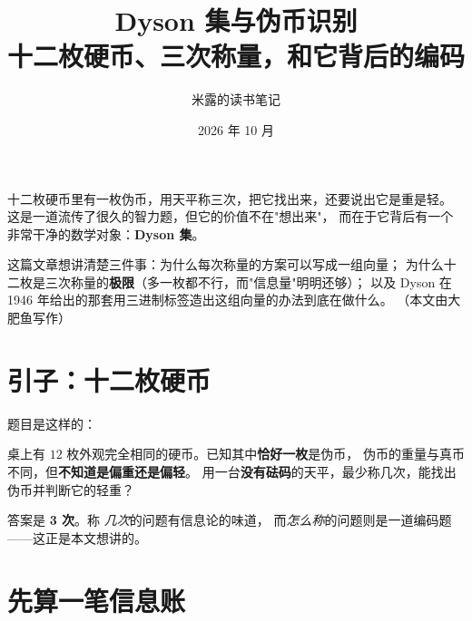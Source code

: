 \documentclass[UTF8,11pt,fontset=macnew]{ctexart}
\title{\bfseries Dyson 集与伪币识别\\[0.35em]
  \large 十二枚硬币、三次称量，和它背后的编码}
\author{米露的读书笔记}
\date{2026 年 10 月}
\begin{document}
\maketitle
\pagestyle{plain}
\thispagestyle{empty}

\begin{keybox}[这篇文章想做的事]
十二枚硬币里有一枚伪币，用天平称三次，把它找出来，还要说出它是重是轻。
这是一道流传了很久的智力题，但它的价值不在"想出来"，
而在于它背后有一个非常干净的数学对象：\textbf{Dyson 集}。

这篇文章想讲清楚三件事：为什么每次称量的方案可以写成一组向量；
为什么十二枚是三次称量的\textbf{极限}（多一枚都不行，而"信息量"明明还够）；
以及 Dyson 在 1946 年给出的那套用三进制标签造出这组向量的办法到底在做什么。
（本文由大肥鱼写作）
\end{keybox}

\section{引子：十二枚硬币}

\begin{center}
\end{center}

题目是这样的：

\begin{keybox}[十二枚硬币问题]
桌上有 $12$ 枚外观完全相同的硬币。已知其中\textbf{恰好一枚}是伪币，
伪币的重量与真币不同，但\textbf{不知道是偏重还是偏轻}。
用一台\textbf{没有砝码}的天平，最少称几次，能找出伪币并判断它的轻重？
\end{keybox}

答案是 \textbf{3 次}。称 \emph{几次}的问题有信息论的味道，
而\emph{怎么称}的问题则是一道编码题——这正是本文想讲的。

\section{先算一笔信息账}
\end{document}
